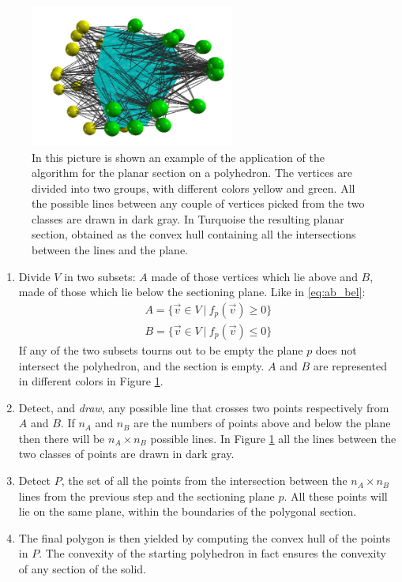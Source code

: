 \begin{figure}
    \centering
    \includegraphics[width = 0.6\textwidth]{images/sec_pol}
    \caption{In this picture is shown an example of the application of the algorithm for the planar section on a polyhedron. The vertices are divided into two groups, with different colors yellow and green. All the possible lines between any couple of vertices picked from the two classes are drawn in dark gray. In Turquoise the resulting planar section, obtained as the convex hull containing all the intersections between the lines and the plane.}
    \label{fig:sec_pol}
\end{figure}

\begin{enumerate}
    \item Divide $V$ in two subsets: $A$ made of those vertices which lie above and $B$, made of those which lie below the sectioning plane. Like in \ref{eq:ab_bel}:
    \begin{align}
        A = \{ \vec v \in V \ |\ f_p(\vec v)\geq 0\} \label{eq:ab_bel} \\
        B = \{ \vec v \in V \ |\ f_p(\vec v)\leq 0\} \nonumber
    \end{align}
    If any of the two subsets tourns out to be empty the plane $p$ does not intersect the polyhedron, and the section is empty. $A$ and $B$ are represented in different colors in Figure \ref{fig:sec_pol}.

    \item Detect, and \textit{draw}, any possible line that crosses two points respectively from $A$ and $B$. If $n_A$ and $n_B$ are the numbers of points above and below the plane then there will be $n_A \times n_B$ possible lines. In Figure \ref{fig:sec_pol} all the lines between the two classes of points are drawn in dark gray.

    \item Detect $P$, the set of all the points from the intersection between the $n_A \times n_B$ lines from the previous step and the sectioning plane $p$. All these points will lie on the same plane, within the boundaries of the polygonal section.

    \item The final polygon is then yielded by computing the convex hull of the points in $P$. The convexity of the starting polyhedron in fact ensures the convexity of any section of the solid.
\end{enumerate}

